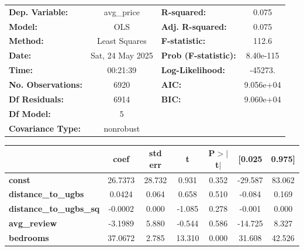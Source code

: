 \begin{center}
\begin{tabular}{lclc}
\toprule
\textbf{Dep. Variable:}         &    avg\_price    & \textbf{  R-squared:         } &       0.075    \\
\textbf{Model:}                 &       OLS        & \textbf{  Adj. R-squared:    } &       0.075    \\
\textbf{Method:}                &  Least Squares   & \textbf{  F-statistic:       } &       112.6    \\
\textbf{Date:}                  & Sat, 24 May 2025 & \textbf{  Prob (F-statistic):} &   8.40e-115    \\
\textbf{Time:}                  &     00:21:39     & \textbf{  Log-Likelihood:    } &     -45273.    \\
\textbf{No. Observations:}      &        6920      & \textbf{  AIC:               } &   9.056e+04    \\
\textbf{Df Residuals:}          &        6914      & \textbf{  BIC:               } &   9.060e+04    \\
\textbf{Df Model:}              &           5      & \textbf{                     } &                \\
\textbf{Covariance Type:}       &    nonrobust     & \textbf{                     } &                \\
\bottomrule
\end{tabular}
\begin{tabular}{lcccccc}
                                & \textbf{coef} & \textbf{std err} & \textbf{t} & \textbf{P$> |$t$|$} & \textbf{[0.025} & \textbf{0.975]}  \\
\midrule
\textbf{const}                  &      26.7373  &       28.732     &     0.931  &         0.352        &      -29.587    &       83.062     \\
\textbf{distance\_to\_ugbs}     &       0.0424  &        0.064     &     0.658  &         0.510        &       -0.084    &        0.169     \\
\textbf{distance\_to\_ugbs\_sq} &      -0.0002  &        0.000     &    -1.085  &         0.278        &       -0.001    &        0.000     \\
\textbf{avg\_review}            &      -3.1989  &        5.880     &    -0.544  &         0.586        &      -14.725    &        8.327     \\
\textbf{bedrooms}               &      37.0672  &        2.785     &    13.310  &         0.000        &       31.608    &       42.526     \\

\end{tabular}
\end{center}
